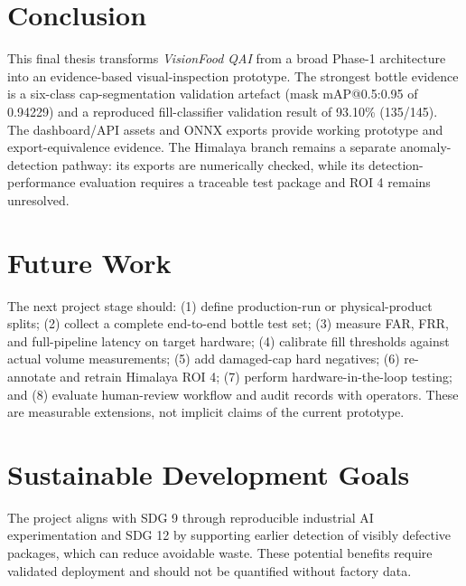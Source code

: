 \documentclass[12pt,a4paper]{report}
\newcommand{\project}{\textit{VisionFood QAI}}
\begin{document}
\section{Conclusion}
This final thesis transforms \project{} from a broad Phase-1 architecture into an evidence-based visual-inspection prototype. The strongest bottle evidence is a six-class cap-segmentation validation artefact (mask mAP@0.5:0.95 of 0.94229) and a reproduced fill-classifier validation result of 93.10\% (135/145). The dashboard/API assets and ONNX exports provide working prototype and export-equivalence evidence. The Himalaya branch remains a separate anomaly-detection pathway: its exports are numerically checked, while its detection-performance evaluation requires a traceable test package and ROI 4 remains unresolved.

\section{Future Work}
The next project stage should: (1) define production-run or physical-product splits; (2) collect a complete end-to-end bottle test set; (3) measure FAR, FRR, and full-pipeline latency on target hardware; (4) calibrate fill thresholds against actual volume measurements; (5) add damaged-cap hard negatives; (6) re-annotate and retrain Himalaya ROI 4; (7) perform hardware-in-the-loop testing; and (8) evaluate human-review workflow and audit records with operators. These are measurable extensions, not implicit claims of the current prototype.

\section{Sustainable Development Goals}
The project aligns with SDG 9 through reproducible industrial AI experimentation and SDG 12 by supporting earlier detection of visibly defective packages, which can reduce avoidable waste. These potential benefits require validated deployment and should not be quantified without factory data.

\printbibliography
\appendix
\end{document}
